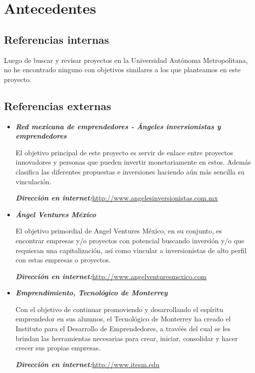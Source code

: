 \documentclass[12pt,letterpaper,titlepage]{article}
\begin{document}

\section{Antecedentes}
\subsection{Referencias internas}
Luego de buscar y revisar proyectos en la Universidad Aut\'onoma Metropolitana, no he encontrado ninguno con objetivos similares a los que planteamos en este proyecto.

\subsection{Referencias externas}
\begin{itemize}
\item \textit{\textbf{Red mexicana de emprendedores - \'Angeles inversionistas y emprendedores}}

El objetivo principal de este proyecto es servir de enlace entre proyectos innovadores y personas que pueden invertir monetariamente en estos. Adem\'as clasifica las diferentes propuestas e inversiones haciendo a\'un m\'as sencilla su vinculaci\'on.

\textit{\textbf{Direcci\'on en internet:}}\href{http://www.angelesinversionistas.com.mx}{http://www.angelesinversionistas.com.mx}

\item \textit{\textbf{\'Angel Ventures M\'exico }}

El objetivo primordial de Angel Ventures M\'exico, en su conjunto, es encontrar empresas y/o proyectos con potencial buscando inversi\'on y/o que requieran una capitalizaci\'on, as\'i como vincular a inversionistas de alto perfil con estas empresas o proyectos.

\textit{\textbf{Direcci\'on en internet:}}\href{http://www.angelventuresmexico.com}{http://www.angelventuresmexico.com}


\item \textit{\textbf{Emprendimiento, Tecnol\'ogico de Monterrey}}

Con el objetivo de continuar promoviendo y desarrollando el esp\'iritu emprendedor en sus alumnos, el Tecnol\'ogico de Monterrey ha creado el Instituto para el Desarrollo de Emprendedores, a travé\'es del cual se les brindan las herramientas necesarias para crear, iniciar, consolidar y hacer crecer sus propias empresas. 

\textit{\textbf{Direcci\'on en internet:}}\href{http://www.itesm.edu/wps/wcm/connect/ITESM/Tecnologico+de+Monterrey/Emprendimiento/#2}{http://www.itesm.edu}



\end{itemize}
\end{document}
